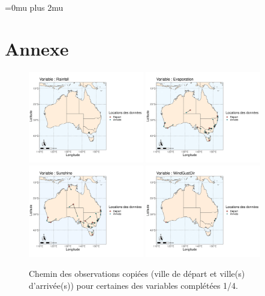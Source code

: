 \documentclass{article}
\begin{document}
\newpage
\Urlmuskip=0mu plus 2mu
\printbibliography

\newpage
\section{Annexe}

\begin{figure}[htp]
    \centering
    \includegraphics[width=0.45\textwidth]{Images/Australia_map_segments_complete/Australia_map_segments_complete-01.png}
    \includegraphics[width=0.45\textwidth]{Images/Australia_map_segments_complete/Australia_map_segments_complete-02.png}
    \includegraphics[width=0.45\textwidth]{Images/Australia_map_segments_complete/Australia_map_segments_complete-03.png}
    \includegraphics[width=0.45\textwidth]{Images/Australia_map_segments_complete/Australia_map_segments_complete-04.png}
    \caption{Chemin des observations copiées (ville de départ et ville(s) d'arrivée(s)) pour certaines des variables complétées 1/4.}
    \label{fig:path_data1}
\end{figure}
\end{document}
